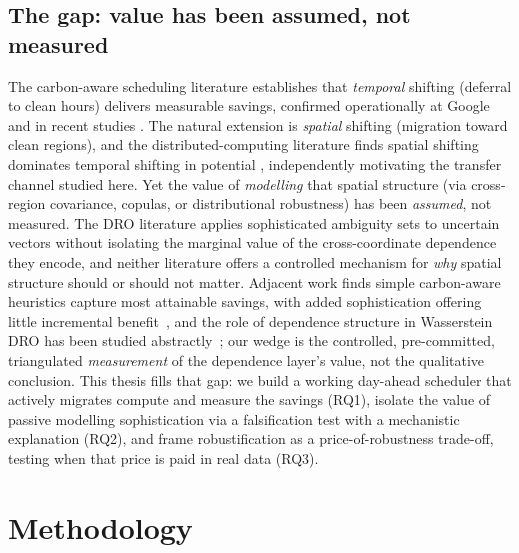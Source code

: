 \documentclass[12pt]{article}
\begin{document}
\subsection{The gap: value has been assumed, not measured}
The carbon-aware scheduling literature establishes that \emph{temporal} shifting
(deferral to clean hours) delivers measurable savings, confirmed operationally at
Google and in recent studies \citep{radovanovic2022,wiesner2021}. The natural extension
is \emph{spatial} shifting (migration toward clean regions), and the
distributed-computing literature finds spatial shifting dominates temporal shifting in
potential \citep{wiesner2021}, independently motivating the transfer channel studied
here. Yet the value of \emph{modelling} that spatial structure (via cross-region covariance,
copulas, or distributional robustness) has been \emph{assumed}, not measured. The DRO
literature applies sophisticated ambiguity sets to uncertain vectors without isolating
the marginal value of the cross-coordinate dependence they encode, and neither
literature offers a controlled mechanism for \emph{why} spatial structure should or
should not matter. Adjacent work finds simple carbon-aware heuristics capture most
attainable savings, with added sophistication offering little incremental
benefit~\citep{bostandoost2024}, and the role of dependence structure in Wasserstein
DRO has been studied abstractly~\citep{gao2017}; our wedge is the controlled,
pre-committed, triangulated \emph{measurement} of the dependence layer's value, not
the qualitative conclusion. This thesis fills that gap: we build a working day-ahead
scheduler
that actively migrates compute and measure the savings (RQ1), isolate the value of
passive modelling sophistication via a falsification test with a mechanistic explanation (RQ2),
and frame robustification as a price-of-robustness trade-off, testing when that price is
paid in real data (RQ3).

\section{Methodology}\label{sec:method}
\end{document}
